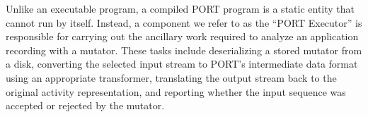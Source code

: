 Unlike an executable program, a compiled PORT program is a static entity
that cannot run by itself.  Instead, a component we refer to as the
``PORT Executor'' is responsible for carrying out the ancillary work
required to analyze an application recording with a mutator.
These tasks include deserializing a stored mutator from a disk,
converting the selected input stream
to PORT's intermediate data format
using an appropriate transformer,
translating the output stream back to the original activity representation,
and reporting whether the input sequence was
accepted or rejected by the mutator.

